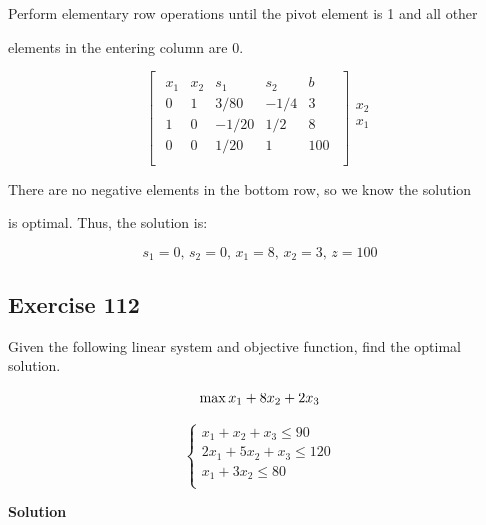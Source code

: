 \documentclass{article}
\begin{document}
\vspace{\baselineskip}

Perform elementary row operations until the pivot element is 1 and all other 

elements in the entering column are 0.

\[
\begin{bmatrix}
\begin{array}{cccc|c}
x_1 & x_2 & s_1 & s_2 & b \\
\hline
0 & 1 & 3/80 & -1/4 & 3 \\
1 & 0 & -1/20 & 1/2 & 8 \\
\hline
0 & 0 & 1/20 & 1 & 100 \\
\end{array}
\end{bmatrix}
\begin{array}{c}
\\
x_2 \\
x_1 \\
\\
\end{array}
\]

There are no negative elements in the bottom row, so we know the solution 

is optimal. Thus, the solution is:

\begin{equation*}
s_1 = 0, \, s_2 = 0, \, x_1 = 8, \, x_2 = 3, \, z = 100
\end{equation*}

\subsection*{Exercise 112}
\begin{flushleft}
Given the following linear system and objective function, find the optimal solution.
\end{flushleft}

\begin{equation*}
\max{ x_1 + 8x_2 + 2x_3 } \\
\end{equation*}

\[
\left\{
\begin{array}{c}
x_1 + x_2 + x_3 \leq 90 \\  
2x_1 + 5x_2 + x_3 \leq 120 \\  
x_1 + 3x_2 \leq 80 \\ 
\end{array}
\right.
\]

\begin{flushleft}
\textbf{Solution}
\end{flushleft}
\end{document}

